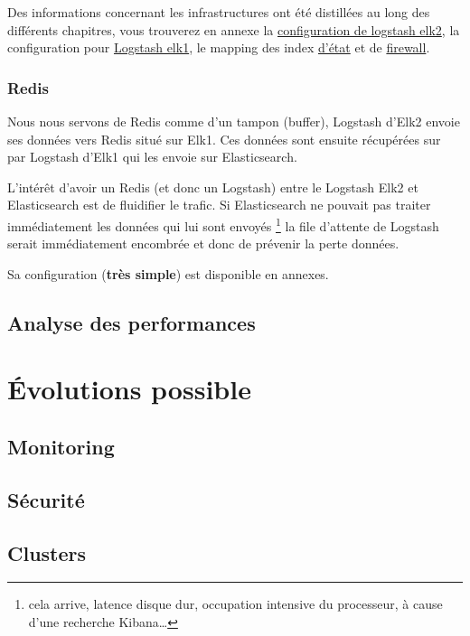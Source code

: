 Des informations concernant les infrastructures ont été distillées au long des différents
chapitres, vous trouverez en annexe la \hyperref[]{configuration de logstash elk2},
la configuration pour \hyperref[]{Logstash elk1}, le mapping des index \hyperref[]{d'état} et 
de \hyperref[]{firewall}. 

\subsubsection{Redis}
Nous nous servons de Redis comme d'un tampon (buffer), Logstash d'Elk2 envoie ses 
données vers Redis situé sur Elk1. Ces données sont ensuite récupérées sur par Logstash
d'Elk1 qui les envoie sur Elasticsearch.

L'intérêt d'avoir un Redis (et donc un Logstash) entre le Logstash Elk2 et Elasticsearch
est de fluidifier le trafic. Si Elasticsearch ne pouvait pas traiter immédiatement 
les données qui lui sont envoyés \footnote{cela arrive, latence disque dur, occupation
intensive du processeur, à cause d'une recherche Kibana\ldots} la file d'attente 
de Logstash serait immédiatement encombrée et donc de prévenir la perte données.

Sa configuration (\textbf{très simple}) est disponible en annexes.

\subsection{Analyse des performances}



\section{Évolutions possible}
\subsection{Monitoring}
\subsection{Sécurité}
\subsection{Clusters}

